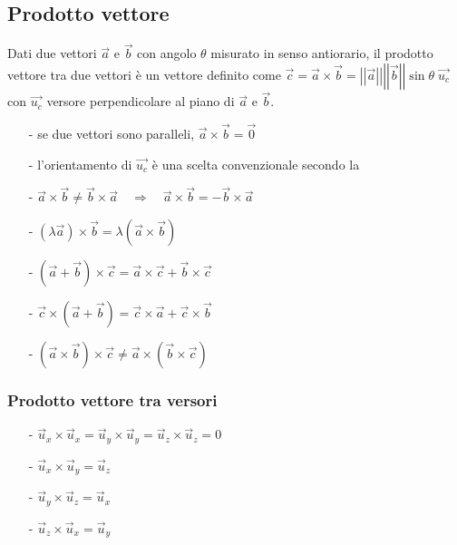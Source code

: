 \documentclass[a4paper]{article}
\newcommand\ux{\vec{u}_x}
\newcommand\uy{\vec{u}_y}
\newcommand\uz{\vec{u}_z}
\newcommand\vmod[1]{\left|\left|{#1}\right|\right|}
\begin{document}
\subsection{Prodotto vettore}
Dati due vettori \(\vec{a}\) e \(\vec{b}\) con angolo \(\theta\) misurato in senso antiorario, il prodotto vettore tra due vettori
è un vettore definito come \(\vec{c} = \vec{a} \times \vec{b} = \vmod{\vec{a}} \vmod{\vec{b}} \sin \theta \; \vec{u_c}\)
con \(\vec{u_c}\) versore perpendicolare al piano di \(\vec{a}\) e \(\vec{b}\).
\begin{itemize}[topsep=3pt, itemsep=0pt]
	\item[-] se due vettori sono paralleli, \(\vec{a} \times \vec{b} = \vec{0}\)
	\item[-] l'orientamento di \(\vec{u_c}\) è una scelta convenzionale secondo la 
	\item[-] \(\vec{a} \times \vec{b} \neq \vec{b} \times \vec{a} \quad \Rightarrow \quad \vec{a} \times \vec{b} = - \vec{b} \times \vec{a}\)
	\item[-] \((\lambda \vec{a}) \times \vec{b} = \lambda (\vec{a} \times \vec{b})\)
	\item[-] \((\vec{a} + \vec{b}) \times \vec{c} = \vec{a} \times \vec{c} + \vec{b} \times \vec{c}\)
	\item[-] \(\vec{c} \times (\vec{a} + \vec{b}) = \vec{c} \times \vec{a} + \vec{c} \times \vec{b}\)
	\item[-] \((\vec{a} \times \vec{b}) \times \vec{c} \neq \vec{a} \times (\vec{b} \times \vec{c})\)
\end{itemize}

\subsubsection*{Prodotto vettore tra versori}
\begin{itemize}[topsep=3pt, itemsep=0pt]
	\item[-] \(\ux \times \ux = \uy \times \uy = \uz \times \uz = 0\)
	\item[-] \(\ux \times \uy = \uz\)
	\item[-] \(\uy \times \uz = \ux\)
	\item[-] \(\uz \times \ux = \uy\)
\end{itemize}
\end{document}
